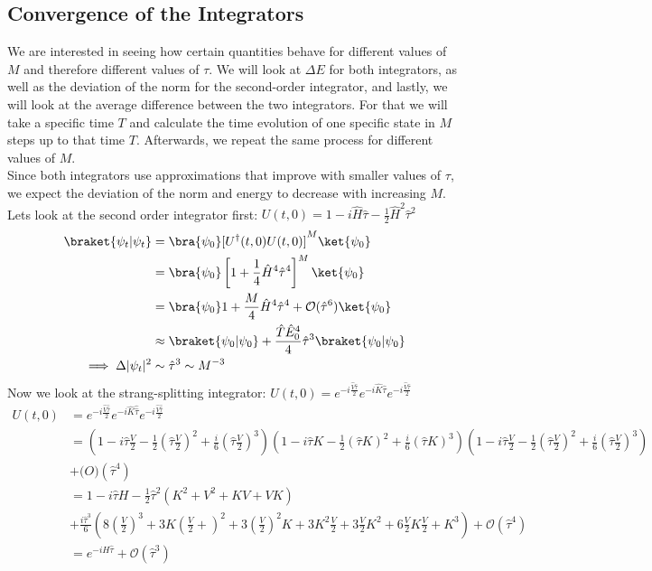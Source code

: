 \documentclass[11pt, letterpaper, onecolumn]{article}
\begin{document}
	\subsection{Convergence of the Integrators}
	We are interested in seeing how certain quantities behave for different values of $M$ and therefore different values of $\tau$. We will look at $\Delta E$ for both integrators, as well as the deviation of the norm for the second-order integrator, and lastly, we will look at the average difference between the two integrators. For that we will take a specific time $T$ and calculate the time evolution of one specific state in $M$ steps up to that time $T$. Afterwards, we repeat the same process for different values of $M$.\\
    Since both integrators use approximations that improve with smaller values of $\tau$, we expect the deviation of the norm and energy to decrease with increasing $M$. Lets look at the second order integrator first: $U(t,0)=1-i\hat{H}\hat{\tau}-\frac12\hat{H}^2\hat{\tau}^2$
    \begin{align*}
        \braket{\psi_t|\psi_t}&=\bra{\psi_0}[U^\dagger(t,0)U(t,0)]^M\ket{\psi_0}\\
        &=\bra{\psi_0}\left[1+\frac{1}{4}\hat{H}^4\hat{\tau}^4 \right]^M\ket{\psi_0}\\
        &=\bra{\psi_0}1+\frac{M}{4}\hat{H}^4\hat{\tau}^4+\mathcal{O}(\hat{\tau}^6)\ket{\psi_0}\\
        &\approx \braket{\psi_0|\psi_0}+\frac{\hat{T}\hat{E}_0^4}{4}\hat{\tau}^3\braket{\psi_0|\psi_0}\\
        \implies \Delta|\psi_t|^2&\sim\hat{\tau}^3\sim M^{-3}
    \end{align*}
    Now we look at the strang-splitting integrator: $U(t,0)=e^{-i\frac{\hat{V}\hat{\tau}}{2}}e^{-i\hat{K}\hat{\tau}}e^{-i\frac{\hat{V}\hat{\tau}}{2}}$
    \begin{align*}
        U(t,0)&=e^{-i\frac{\hat{V}\hat{\hat{\tau}}}{2}}e^{-i\hat{K}\hat{\hat{\tau}}}e^{-i\frac{\hat{V}\hat{\hat{\tau}}}{2}}\\
        &=(1-i\hat{\tau}\frac{V}{2}-\frac{1}{2}\left(\hat{\tau}\frac{V}{2}\right)^2+\frac{i}{6}\left(\hat{\tau}\frac{V}{2}\right)^3)(1-i\hat{\tau} K-\frac{1}{2}\left(\hat{\tau} K\right)^2+\frac{i}{6}\left(\hat{\tau} K\right)^3)(1-i\hat{\tau}\frac{V}{2}-\frac{1}{2}\left(\hat{\tau}\frac{V}{2}\right)^2+\frac{i}{6}\left(\hat{\tau}\frac{V}{2}\right)^3)\\&+\mathcal(O)(\hat{\tau}^4)\\
        &=1-i\hat{\tau} H-\frac{1}{2}\hat{\tau}^2(K^2+V^2+KV+VK)\\&+\frac{i\hat{\tau}^3}{6}\left(8\left(\frac{V}{2} \right)^3 + 3K\left(\frac{V}{2} +\right)^2 + 3\left(\frac{V}{2} \right)^2K +3K^2\frac{V}{2}+3\frac{V}{2}K^2 +6\frac{V}{2}K\frac{V}{2}+K^3 \right) +\mathcal{O}(\hat{\tau}^4)\\
        &=e^{-iH\hat{\tau}}+\mathcal{O}(\hat{\tau}^3)
    \end{align*}
\end{document}
